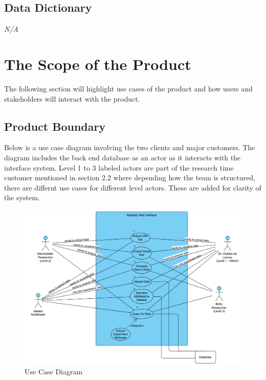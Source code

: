 \documentclass[12pt]{article}
\begin{document}
\subsection{Data Dictionary}
\emph{N/A}

\section{The Scope of the Product}
The following section will highlight use cases of the product and how users and
stakeholders will interact with the product.  
\subsection{Product Boundary}
Below is a use case diagram involving the two clients and major customers. The
diagram includes the back end database as an actor as it interacts with the
interface system. Level 1 to 3 labeled actors are part of the research time
customer mentioned in section 2.2 where depending how the team is structured,
there are differnt use cases for different level actors. These are added for
clarity of the system.

\begin{figure}[H]
  \centering
  \includegraphics[scale=0.5]{capstoneUseCase.png}
  \caption{Use Case Diagram}
\end{figure}
\end{document}
